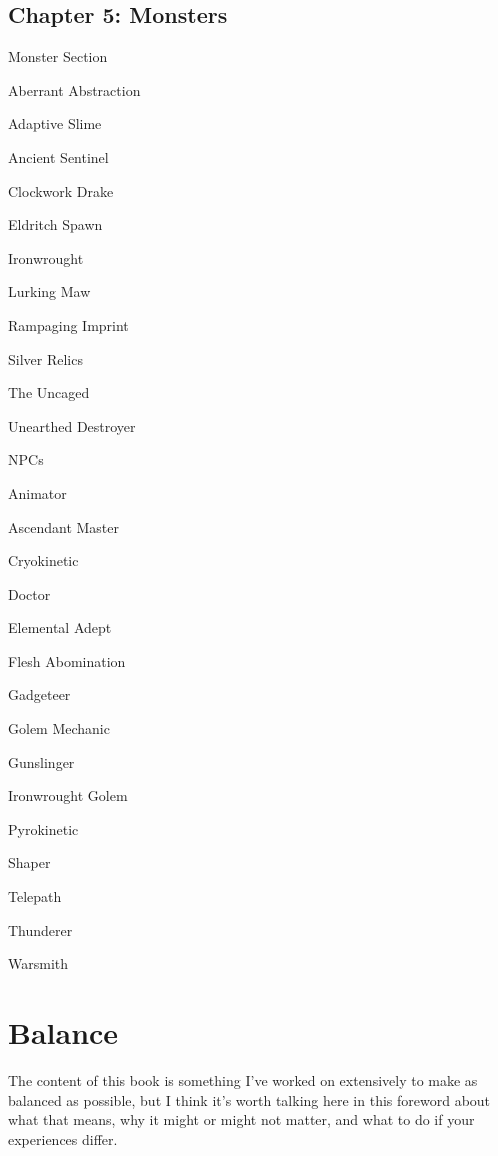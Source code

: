 \documentclass[11pt,twoside,openany]{book}  %
\begin{document}
\section*{Chapter 5: Monsters}
\begin{fiveitemize}
	\item Monster Section
		\begin{fiveitemize}
			\item Aberrant Abstraction
			\item Adaptive Slime
			\item Ancient Sentinel
			\item Clockwork Drake
			\item Eldritch Spawn
			\item Ironwrought
			\item Lurking Maw
			\item Rampaging Imprint
			\item Silver Relics
			\item The Uncaged
			\item Unearthed Destroyer
		\end{fiveitemize}	
	\item NPCs
		\begin{fiveitemize}
			\item Animator
			\item Ascendant Master
			\item Cryokinetic
			\item Doctor
			\item Elemental Adept
			\item Flesh Abomination
			\item Gadgeteer
			\item Golem Mechanic
			\item Gunslinger
			\item Ironwrought Golem
			\item Pyrokinetic
			\item Shaper
			\item Telepath
			\item Thunderer
			\item Warsmith
		\end{fiveitemize}
\end{fiveitemize}

\chapter*{Balance}
The content of this book is something I’ve worked on extensively to make as balanced as possible, but I think it’s worth talking here in this foreword about what that means, why it might or might not matter, and what to do if your experiences differ.
\end{document}
